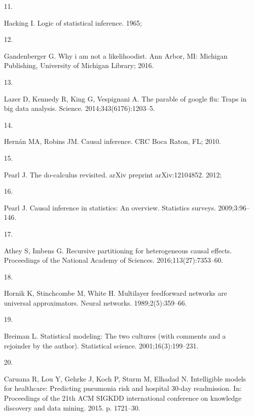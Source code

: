 \documentclass[
  10pt,
]{scrbook}
\newlength{\cslhangindent}
\newlength{\csllabelwidth}
\newlength{\cslentryspacingunit} %
\newenvironment{CSLReferences}[2] %
 {%
  \setlength{\parindent}{0pt}
  \ifodd #1
  \let\oldpar\par
  \def\par{\hangindent=\cslhangindent\oldpar}
  \fi
  \setlength{\parskip}{#2\cslentryspacingunit}
 }%
 {}
\newcommand{\CSLLeftMargin}[1]{\parbox[t]{\csllabelwidth}{#1}}
\newcommand{\CSLRightInline}[1]{\parbox[t]{\linewidth - \csllabelwidth}{#1}\break}
\begin{document}
\begin{CSLReferences}{0}{0}
\leavevmode{}%
\CSLLeftMargin{11. }
\CSLRightInline{Hacking I. Logic of statistical inference. 1965; }

\leavevmode{}%
\CSLLeftMargin{12. }
\CSLRightInline{Gandenberger G. Why i am not a likelihoodist. Ann Arbor, MI: Michigan Publishing, University of Michigan Library; 2016. }

\leavevmode{}%
\CSLLeftMargin{13. }
\CSLRightInline{Lazer D, Kennedy R, King G, Vespignani A. The parable of google flu: Traps in big data analysis. Science. 2014;343(6176):1203--5. }

\leavevmode{}%
\CSLLeftMargin{14. }
\CSLRightInline{Hernán MA, Robins JM. Causal inference. CRC Boca Raton, FL; 2010. }

\leavevmode{}%
\CSLLeftMargin{15. }
\CSLRightInline{Pearl J. The do-calculus revisited. arXiv preprint arXiv:12104852. 2012; }

\leavevmode{}%
\CSLLeftMargin{16. }
\CSLRightInline{Pearl J. Causal inference in statistics: An overview. Statistics surveys. 2009;3:96--146. }

\leavevmode{}%
\CSLLeftMargin{17. }
\CSLRightInline{Athey S, Imbens G. Recursive partitioning for heterogeneous causal effects. Proceedings of the National Academy of Sciences. 2016;113(27):7353--60. }

\leavevmode{}%
\CSLLeftMargin{18. }
\CSLRightInline{Hornik K, Stinchcombe M, White H. Multilayer feedforward networks are universal approximators. Neural networks. 1989;2(5):359--66. }

\leavevmode{}%
\CSLLeftMargin{19. }
\CSLRightInline{Breiman L. Statistical modeling: The two cultures (with comments and a rejoinder by the author). Statistical science. 2001;16(3):199--231. }

\leavevmode{}%
\CSLLeftMargin{20. }
\CSLRightInline{Caruana R, Lou Y, Gehrke J, Koch P, Sturm M, Elhadad N. Intelligible models for healthcare: Predicting pneumonia risk and hospital 30-day readmission. In: Proceedings of the 21th ACM SIGKDD international conference on knowledge discovery and data mining. 2015. p. 1721--30. }


\end{CSLReferences}
\end{document}
